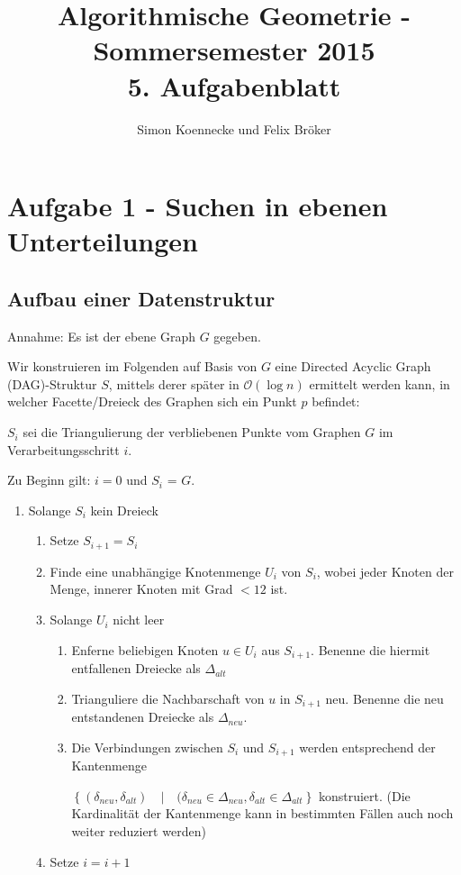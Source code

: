 \documentclass[a4paper]{article}
\begin{document}
\title{Algorithmische Geometrie - Sommersemester 2015\\
       5. Aufgabenblatt }
\author{Simon Koennecke und Felix Bröker}
\date{}
\maketitle

\section*{Aufgabe 1 - Suchen in ebenen Unterteilungen}
\subsection*{Aufbau einer Datenstruktur}
Annahme: Es ist der ebene Graph $G$ gegeben. 

Wir konstruieren im Folgenden auf Basis von $G$ eine Directed Acyclic Graph (DAG)-Struktur $S$, mittels derer 
später in $\mathcal{O}(\log n)$ ermittelt werden kann, in welcher Facette/Dreieck des Graphen
sich ein Punkt $p$ befindet:

$S_i$ sei die Triangulierung der verbliebenen Punkte vom Graphen $G$ im Verarbeitungsschritt $i$.

Zu Beginn gilt: $i = 0$ und $S_i$ = $G$.

\begin{enumerate}
 \item Solange $S_i$ kein Dreieck
 \begin{enumerate}
  \item Setze $S_{i+1} = S_i$
  \item Finde eine unabhängige Knotenmenge $U_i$ von $S_i$, wobei jeder Knoten der Menge, innerer Knoten mit Grad $< 12$ ist.
  \item Solange $U_i$ nicht leer
  \begin{enumerate}
   \item Enferne beliebigen Knoten $u \in U_i$ aus $S_{i+1}$. Benenne die hiermit entfallenen Dreiecke als $\Delta_{alt}$
   \item Trianguliere die Nachbarschaft von $u$ in $S_{i+1}$ neu. Benenne die neu entstandenen Dreiecke als $\Delta_{neu}$.
   \item Die Verbindungen zwischen $S_i$ und $S_{i+1}$ werden entsprechend der Kantenmenge
   
   $\left\{(\delta_{neu}, \delta_{alt}) \quad|\quad (\delta_{neu} \in \Delta_{neu}, \delta_{alt} \in \Delta_{alt} \right\}$ konstruiert.
   (Die Kardinalität der Kantenmenge kann in bestimmten Fällen auch noch weiter reduziert werden)
  \end{enumerate}
  \item Setze $i = i + 1$
 \end{enumerate}

\end{enumerate}
\end{document}
